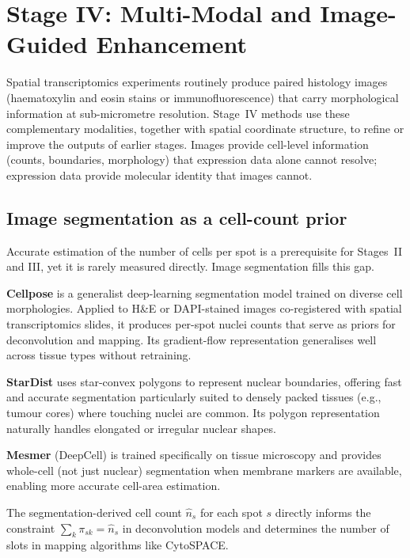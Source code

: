 \section{Stage IV: Multi-Modal and Image-Guided Enhancement}
\label{sec:stage4}

Spatial transcriptomics experiments routinely produce paired histology images (haematoxylin and eosin stains or immunofluorescence) that carry morphological information at sub-micrometre resolution. Stage~IV methods use these complementary modalities, together with spatial coordinate structure, to refine or improve the outputs of earlier stages. Images provide cell-level information (counts, boundaries, morphology) that expression data alone cannot resolve; expression data provide molecular identity that images cannot.

\subsection{Image segmentation as a cell-count prior}

Accurate estimation of the number of cells per spot is a prerequisite for Stages~II and III, yet it is rarely measured directly. Image segmentation fills this gap.

\textbf{Cellpose} \citep{stringer2021cellpose} is a generalist deep-learning segmentation model trained on diverse cell morphologies. Applied to H\&E or DAPI-stained images co-registered with spatial transcriptomics slides, it produces per-spot nuclei counts that serve as priors for deconvolution and mapping. Its gradient-flow representation generalises well across tissue types without retraining.

\textbf{StarDist} \citep{schmidt2018stardist} uses star-convex polygons to represent nuclear boundaries, offering fast and accurate segmentation particularly suited to densely packed tissues (e.g., tumour cores) where touching nuclei are common. Its polygon representation naturally handles elongated or irregular nuclear shapes.

\textbf{Mesmer} (DeepCell) \citep{greenwald2022mesmer} is trained specifically on tissue microscopy and provides whole-cell (not just nuclear) segmentation when membrane markers are available, enabling more accurate cell-area estimation.

The segmentation-derived cell count $\hat{n}_s$ for each spot $s$ directly informs the constraint $\sum_k \pi_{sk} = \hat{n}_s$ in deconvolution models and determines the number of slots in mapping algorithms like CytoSPACE.


